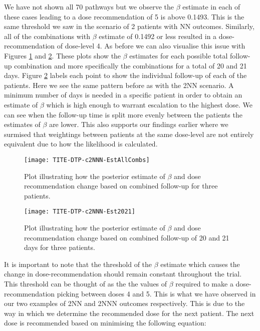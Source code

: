 We have not shown all 70 pathways but we observe the $\beta$ estimate in each of these cases leading to a dose recommendation of 5 is above 0.1493. This is the same threshold we saw in the scenario of 2 patients with NN outcomes. Similarly, all of the combinations with $\beta$ estimate of 0.1492 or less resulted in a dose-recommendation of  dose-level 4. As before we can also visualise this issue with Figures \ref{fig_tite-dtp:c2NNNEstAllCombs} and \ref{fig_tite-dtp:c2NNNEst2021}. These plots show the $\beta$ estimates for each possible total follow-up combination and more specifically the combinations for a total of 20 and 21 days. Figure \ref{fig_tite-dtp:c2NNNEst2021} labels each point to show the individual follow-up of each of the patients. Here we see the same pattern before as with the 2NN scenario. A minimum number of days is needed in a specific patient in order to obtain an estimate of $\beta$ which is high enough to warrant escalation to the highest dose. We can see when the follow-up time is split more evenly between the patients the estimates of $\beta$ are lower. This also supports our findings earlier where we surmised that weightings between patients at the same dose-level are not entirely equivalent due to how the likelihood is calculated. 

\begin{figure}[h!]
	\centering
	\caption[Changes in $\beta$ based on combined follow-up for three patients.]{Plot illustrating how the posterior estimate of $\beta$ and dose recommendation change based on combined follow-up for three patients.}
	\label{fig_tite-dtp:c2NNNEstAllCombs}
	\texttt{[image: TITE-DTP-c2NNN-EstAllCombs]}
\end{figure}

\begin{figure}[h!]
	\centering
	\caption[Changes in $\beta$ based on combined follow-up of 20 and 21 days for three patients.]{Plot illustrating how the posterior estimate of $\beta$ and dose recommendation change based on combined follow-up of 20 and 21 days for three patients.}
	\label{fig_tite-dtp:c2NNNEst2021}
	\texttt{[image: TITE-DTP-c2NNN-Est2021]}
\end{figure}

It is important to note that the threshold of the $\beta$ estimate which causes the change in dose-recommendation should remain constant throughout the trial. This threshold can be thought of as the the values of $\beta$ required to make a dose-recommendation picking between doses 4 and 5. This is what we have observed in our two examples of 2NN and 2NNN outcomes respectively. This is due to the way in which we determine the recommended dose for the next patient. The next dose is recommended based on minimising the following equation: 

